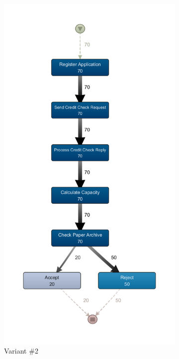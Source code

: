 \begin{figure}
\begin{subfigure}{.4\textwidth}
    \includegraphics[width=.8\linewidth]{5_results_discussions/loan-application-process/ETM_Configuration2}
    \caption{Variant \#2}
    \label{fig:loan-application-process-models-2}
  \end{subfigure} \\
  \begin{subfigure}{.4\textwidth}
    \centering

\end{subfigure}
\end{figure}
